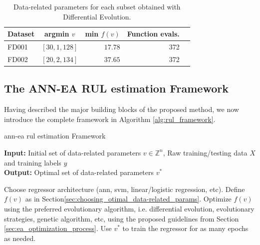 \begin{table}[!htb]
\centering
\begin{tabular}{l | c r r l}
	\hline
	 Dataset & argmin $v$ & min $f(v)$ & Function evals.\\
  	\hline
  	FD001 & $\left[ 30, 1, 128 \right]$ & $17.78$ & 372\\
  	FD002 & $\left[ 20, 2, 134 \right]$ & $37.65$ & 372\\
  	\hline
\end{tabular}
\caption{Data-related parameters for each subset obtained with Differential Evolution.}
\label{table:optimal_data_params}
\end{table}

\subsection{The ANN-EA RUL estimation Framework}

Having described the major building blocks of the proposed method, we now introduce the complete framework in Algorithm \ref{alg:rul_framework}.

\setcounter{algorithm}{0}
\begin{algorithm}[H]
\caption{\gls{ann}-\gls{ea} \gls{rul} estimation Framework}\label{alg:rul_framework}
\textbf{Input:} Initial set of data-related parameters $v \in \mathbb{Z}^n$, Raw training/testing data $X$ and training labels $y$\\
\textbf{Output:} Optimal set of data-related parameters $v^*$
	\begin{algorithmic}[1]
		\State Choose regressor architecture (\gls{ann}, \gls{svm}, linear/logistic regression, etc).
		\State Define $f(v)$ as in Section\ref{sec:choosing_otimal_data-related_params}.
		\State Optimize $f(v)$ using the preferred evolutionary algorithm, i.e. differential evolution, evolutionary strategies, genetic algorithm, etc, using the proposed guidelines from Section \ref{sec:ea_optimization_process}.
		\State Use $v^*$ to train the regressor for as many epochs as needed.
	\end{algorithmic}
\end{algorithm}